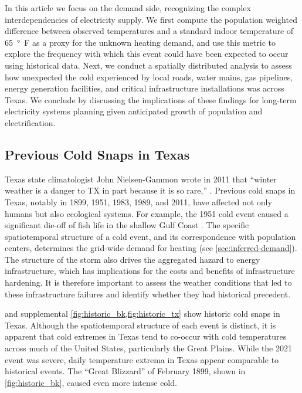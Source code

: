 \documentclass[12pt]{iopart}
\begin{document}
In this article we focus on the demand side, recognizing the complex interdependencies of electricity supply.
We first compute the population weighted difference between observed temperatures and a standard indoor temperature of \SI{65}{\degree F} as a proxy for the unknown heating demand, and use this metric to explore the frequency with which this event could have been expected to occur using historical data.
Next, we conduct a spatially distributed analysis to assess how unexpected the cold experienced by local roads, water mains, gas pipelines, energy generation facilities, and critical infrastructure installations was across Texas.
We conclude by discussing the implications of these findings for long-term electricity systems planning given anticipated growth of population and electrification.

\subsection{Previous Cold Snaps in Texas}


Texas state climatologist John Nielsen-Gammon wrote in 2011 that ``winter weather is a danger to TX in part because it is so rare,'' \cite{nielsen-gammon_txacc:2011}.
Previous cold snaps in Texas, notably in 1899, 1951, 1983, 1989, and 2011, have affected not only humans but also ecological systems.
For example, the 1951 cold event caused a  significant die-off of fish life in the shallow Gulf Coast \cite{gunter_fishes:1951}.
The specific spatiotemporal structure of a cold event, and its correspondence with population centers, determines the grid-wide demand for heating (see \cref{sec:inferred-demand}).
The structure of the storm also drives the aggregated hazard to energy infrastructure, which has implications for the costs and benefits of infrastructure hardening.
It is therefore important to assess the weather conditions that led to these infrastructure failures and identify whether they had historical precedent.

 and supplemental \cref{fig:historic_bk,fig:historic_tx} show historic cold snaps in Texas.
Although the spatiotemporal structure of each event is distinct, it is apparent that cold extremes in Texas tend to co-occur with cold temperatures across much of the United States, particularly the Great Plains.
While the 2021 event was severe, daily temperature extrema in Texas appear comparable to historical events.
The ``Great Blizzard'' of February 1899, shown in \cref{fig:historic_bk}, caused even more intense cold.
\end{document}
